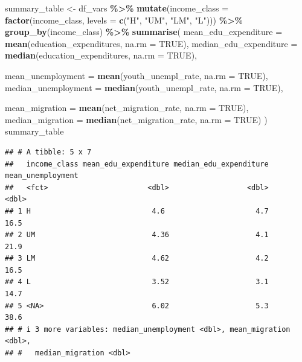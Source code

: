 \documentclass[
]{article}
\newenvironment{Shaded}{\begin{snugshade}}{\end{snugshade}}
\newcommand{\AttributeTok}[1]{\textcolor[rgb]{0.13,0.29,0.53}{#1}}
\newcommand{\ConstantTok}[1]{\textcolor[rgb]{0.56,0.35,0.01}{#1}}
\newcommand{\FunctionTok}[1]{\textcolor[rgb]{0.13,0.29,0.53}{\textbf{#1}}}
\newcommand{\NormalTok}[1]{#1}
\newcommand{\OtherTok}[1]{\textcolor[rgb]{0.56,0.35,0.01}{#1}}
\newcommand{\SpecialCharTok}[1]{\textcolor[rgb]{0.81,0.36,0.00}{\textbf{#1}}}
\newcommand{\StringTok}[1]{\textcolor[rgb]{0.31,0.60,0.02}{#1}}
\begin{document}
\begin{Shaded}
\begin{Highlighting}[]
\NormalTok{summary\_table }\OtherTok{\textless{}{-}}\NormalTok{ df\_vars }\SpecialCharTok{\%\textgreater{}\%}
    \FunctionTok{mutate}\NormalTok{(}\AttributeTok{income\_class =} \FunctionTok{factor}\NormalTok{(income\_class, }\AttributeTok{levels =} \FunctionTok{c}\NormalTok{(}\StringTok{"H"}\NormalTok{, }\StringTok{"UM"}\NormalTok{, }\StringTok{"LM"}\NormalTok{, }\StringTok{"L"}\NormalTok{))) }\SpecialCharTok{\%\textgreater{}\%}
  \FunctionTok{group\_by}\NormalTok{(income\_class) }\SpecialCharTok{\%\textgreater{}\%}
  \FunctionTok{summarise}\NormalTok{(}
    \AttributeTok{mean\_edu\_expenditure =} \FunctionTok{mean}\NormalTok{(education\_expenditures, }\AttributeTok{na.rm =} \ConstantTok{TRUE}\NormalTok{),}
    \AttributeTok{median\_edu\_expenditure =} \FunctionTok{median}\NormalTok{(education\_expenditures, }\AttributeTok{na.rm =} \ConstantTok{TRUE}\NormalTok{),}
    
    \AttributeTok{mean\_unemployment =} \FunctionTok{mean}\NormalTok{(youth\_unempl\_rate, }\AttributeTok{na.rm =} \ConstantTok{TRUE}\NormalTok{),}
    \AttributeTok{median\_unemployment =} \FunctionTok{median}\NormalTok{(youth\_unempl\_rate, }\AttributeTok{na.rm =} \ConstantTok{TRUE}\NormalTok{),}
    
    \AttributeTok{mean\_migration =} \FunctionTok{mean}\NormalTok{(net\_migration\_rate, }\AttributeTok{na.rm =} \ConstantTok{TRUE}\NormalTok{),}
    \AttributeTok{median\_migration =} \FunctionTok{median}\NormalTok{(net\_migration\_rate, }\AttributeTok{na.rm =} \ConstantTok{TRUE}\NormalTok{)}
\NormalTok{  )}
\NormalTok{summary\_table}
\end{Highlighting}
\end{Shaded}

\begin{verbatim}
## # A tibble: 5 x 7
##   income_class mean_edu_expenditure median_edu_expenditure mean_unemployment
##   <fct>                       <dbl>                  <dbl>             <dbl>
## 1 H                            4.6                     4.7              16.5
## 2 UM                           4.36                    4.1              21.9
## 3 LM                           4.62                    4.2              16.5
## 4 L                            3.52                    3.1              14.7
## 5 <NA>                         6.02                    5.3              38.6
## # i 3 more variables: median_unemployment <dbl>, mean_migration <dbl>,
## #   median_migration <dbl>
\end{verbatim}
\end{document}
